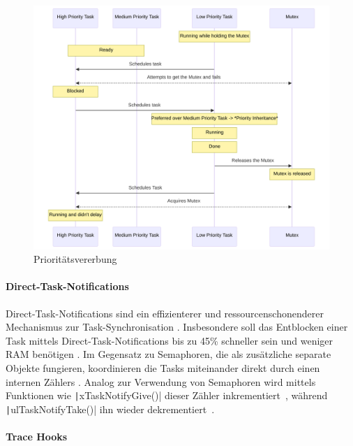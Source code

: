 \begin{figure}[H]
    \centering
    \includegraphics[width=1\textwidth]{assets/prio_inheritance}
    \caption{Prioritätsvererbung}
\end{figure}

\paragraph{Direct-Task-Notifications} \label{sec:direct_task_notification}

Direct-Task-Notifications sind ein effizienterer und ressourcenschonenderer
Mechanismus zur Task-Synchronisation \cite{freertos_task_notifications_desc}.
Insbesondere soll das Entblocken einer Task mittels Direct-Task-Notifications
bis zu 45\% schneller sein und weniger RAM benötigen
\cite{freertos_task_notifications_usage}. Im Gegensatz zu Semaphoren, die als
zusätzliche separate Objekte fungieren, koordinieren die Tasks miteinander
direkt durch einen internen Zählers \cite{freertos_tasks_c_308}. Analog zur
Verwendung von Semaphoren wird mittels Funktionen wie
\texttt|xTaskNotifyGive()| dieser Zähler
inkrementiert~\cite{freertos_tasks_c_4990}, während
\texttt|ulTaskNotifyTake()| ihn wieder
dekrementiert~\cite{freertos_tasks_c_4614}.

\paragraph{Trace Hooks} \label{sec:trace_hooks}

